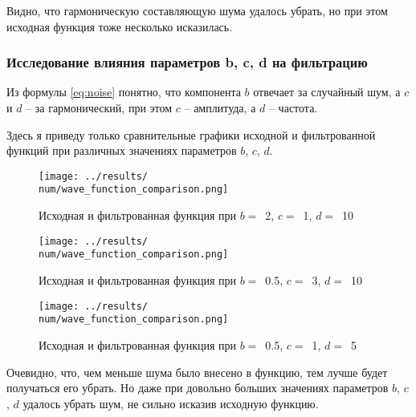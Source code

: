 Видно, что гармоническую составляющую шума удалось убрать, но при этом исходная функция тоже несколько исказилась. 

\FloatBarrier
\subsubsection{Исследование влияния параметров b, c, d на фильтрацию}

Из формулы \eqref{eq:noise} понятно, что компонента $b$ отвечает за случайный шум, а $c$ и $d$ -- за гармонический, при этом $c$ -- амплитуда, а $d$ -- частота.

Здесь я приведу только сравнительные графики исходной и фильтрованной функций при различных значениях параметров $b$, $c$, $d$. 

\def\num{12}
\def\b{2}
\def\c{1}
\def\d{10}
\begin{figure}[ht!]
    \centering
    \texttt{[image: ../results/\\num/wave\_function\_comparison.png]}
    \caption{Исходная и фильтрованная функция при $b =$~\b, $c =$~\c, $d =$~\d}
    \label{fig:wave_function_comparison_\num}
\end{figure}

\def\num{13}
\def\b{0.5}
\def\c{3}
\def\d{10}
\begin{figure}[ht!]
    \centering
    \texttt{[image: ../results/\\num/wave\_function\_comparison.png]}
    \caption{Исходная и фильтрованная функция при $b =$~\b, $c =$~\c, $d =$~\d}
    \label{fig:wave_function_comparison_\num}
\end{figure}

\def\num{14}
\def\b{0.5}
\def\c{1}
\def\d{5}
\begin{figure}[ht!]
    \centering
    \texttt{[image: ../results/\\num/wave\_function\_comparison.png]}
    \caption{Исходная и фильтрованная функция при $b =$~\b, $c =$~\c, $d =$~\d}
    \label{fig:wave_function_comparison_\num}
\end{figure}

Очевидно, что, чем меньше шума было внесено в функцию, тем лучше будет получаться его убрать. 
Но даже при довольно больших значениях параметров $b$, $c$, $d$ удалось убрать шум, не сильно исказив исходную функцию.